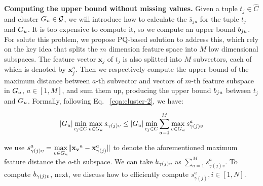 \noindent \textbf{Computing the upper bound without missing values.} 
%
%
Given a tuple $t_j\in \hat{C}$ and cluster $G_u \in \mathcal{G}$, we will introduce how to calculate the $\overline{s}_{ju}$ for the tuple $t_{j}$ and $G_u$. It is too expensive to compute it, so we compute an upper bound $b_{ju}$. For solute this problem, we propose PQ-based solution to address this, which rely on the key idea that splits the $m$ dimension feature space into $M$ low dimensional subspaces. The feature vector $\mathbf{x}_{j}$ of $t_{j}$ is also splitted into $M$ subvectors, each of which is denoted by $\mathbf{x}^a_{j}$. Then we respectively compute the upper bound of the maximum distance between $a$-th subvector and vectors of $m$-th feature subspace in $G_u$, $a\in [1,M]$, and sum them up, producing the upper bound $b_{ju}$ between $t_{j}$ and $G_u$. Formally, following Eq. ~\ref{eqa:cluster-2}, we have:

\begin{equation}\label{eqa:cluster-6}
    \begin{aligned}
        |G_u| \min_{c_j\in C} \max_{v \in G_u} s_{\gamma(j)v} \leq |G_u| \min_{c_j\in C} \sum_{a = 1}^M \max_{v \in G_u} s_{\gamma(j)v}^a
    \end{aligned}
\end{equation}

\noindent we use $s_{\gamma(j)v}^a = \max\limits_{v \in G_u}\lVert \mathbf{x_v}^a - \mathbf{x}^a_{\gamma(j)}\rVert$ to denote the aforementioned maximum feature distance \wrt the $a$-th subspace. We can take $b_{\gamma(j)v}$ as $\sum_{a=1}^{M} s^a_{\gamma(j)v}$. To compute $b_{\gamma(j)v}$, next, we  discuss how to efficiently compute  $s_{\gamma(j)}^a, i\in [1,N]$.

